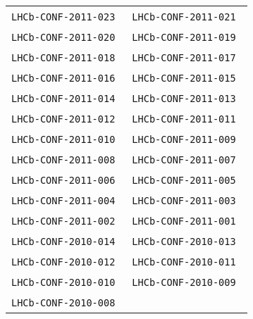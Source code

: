 \begin{center}
\begin{longtable}{ll}
\texttt{LHCb-CONF-2011-023}~\cite{LHCb-CONF-2011-022} &
\texttt{LHCb-CONF-2011-021}~\cite{LHCb-CONF-2011-021} \\
\texttt{LHCb-CONF-2011-020}~\cite{LHCb-CONF-2011-020} &
\texttt{LHCb-CONF-2011-019}~\cite{LHCb-CONF-2011-019} \\
\texttt{LHCb-CONF-2011-018}~\cite{LHCb-CONF-2011-018} &
\texttt{LHCb-CONF-2011-017}~\cite{LHCb-CONF-2011-017} \\
\texttt{LHCb-CONF-2011-016}~\cite{LHCb-CONF-2011-016} &
\texttt{LHCb-CONF-2011-015}~\cite{LHCb-CONF-2011-015} \\
\texttt{LHCb-CONF-2011-014}~\cite{LHCb-CONF-2011-014} &
\texttt{LHCb-CONF-2011-013}~\cite{LHCb-CONF-2011-013} \\
\texttt{LHCb-CONF-2011-012}~\cite{LHCb-CONF-2011-012} &
\texttt{LHCb-CONF-2011-011}~\cite{LHCb-CONF-2011-011} \\
\texttt{LHCb-CONF-2011-010}~\cite{LHCb-CONF-2011-010} &
\texttt{LHCb-CONF-2011-009}~\cite{LHCb-CONF-2011-009} \\
\texttt{LHCb-CONF-2011-008}~\cite{LHCb-CONF-2011-008} &
\texttt{LHCb-CONF-2011-007}~\cite{LHCb-CONF-2011-007} \\
\texttt{LHCb-CONF-2011-006}~\cite{LHCb-CONF-2011-006} &
\texttt{LHCb-CONF-2011-005}~\cite{LHCb-CONF-2011-005} \\
\texttt{LHCb-CONF-2011-004}~\cite{LHCb-CONF-2011-004} &
\texttt{LHCb-CONF-2011-003}~\cite{LHCb-CONF-2011-003} \\
\texttt{LHCb-CONF-2011-002}~\cite{LHCb-CONF-2011-002} &
\texttt{LHCb-CONF-2011-001}~\cite{LHCb-CONF-2011-001} \\
\hline
\texttt{LHCb-CONF-2010-014}~\cite{LHCb-CONF-2010-014} &
\texttt{LHCb-CONF-2010-013}~\cite{LHCb-CONF-2010-013} \\
\texttt{LHCb-CONF-2010-012}~\cite{LHCb-CONF-2010-012} &
\texttt{LHCb-CONF-2010-011}~\cite{LHCb-CONF-2010-011} \\
\texttt{LHCb-CONF-2010-010}~\cite{LHCb-CONF-2010-010} &
\texttt{LHCb-CONF-2010-009}~\cite{LHCb-CONF-2010-009} \\
\texttt{LHCb-CONF-2010-008}~\cite{LHCb-CONF-2010-008} & \\
\hline
\end{longtable}
\end{center}

